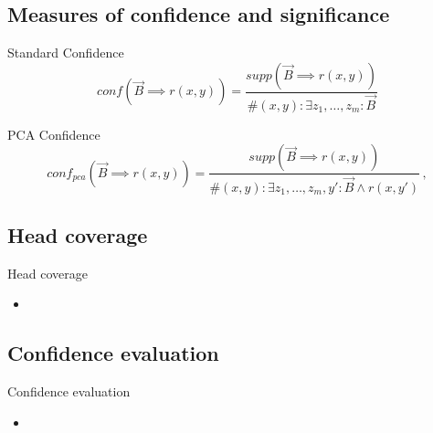 \documentclass[xcolor={x11names}]{beamer}
\begin{document}

\subsection{Measures of confidence and significance}

\begin{frame}{Standard Confidence}
\begin{equation}
    \label{eq:stand_conf}
    conf(\vec{B} \implies r(x, y)) =
             \dfrac{supp(\vec{B} \implies r(x, y))}
                   {\#(x, y): \exists z_1,\ldots,z_m : \vec{B}} %
\end{equation}
\end{frame}

\begin{frame}{PCA Confidence}
\begin{equation}
    \label{eq:pca_conf}
    conf_{pca}(\vec{B} \implies r(x, y)) =
                    \dfrac{supp(\vec{B} \implies r(x, y))}
                          {\#(x, y): \exists z_1,\ldots,z_m, y' :\vec{B} \land r(x, y')} \,,
\end{equation}
\end{frame}

\subsection{Head coverage}
\begin{frame}{Head coverage}
    \begin{itemize}
       \item 
    \end{itemize}
\end{frame}

\subsection{Confidence evaluation}
\begin{frame}{Confidence evaluation}
    \begin{itemize}
       \item 
    \end{itemize}
\end{frame}
\end{document}
